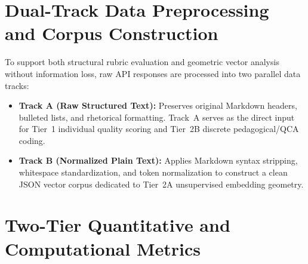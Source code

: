 \section{Dual-Track Data Preprocessing and Corpus Construction}
To support both structural rubric evaluation and geometric vector analysis without information loss, raw API responses are processed into two parallel data tracks:
\begin{itemize}
  \item \textbf{Track A (Raw Structured Text):} Preserves original Markdown headers, bulleted lists, and rhetorical formatting. Track~A serves as the direct input for Tier~1 individual quality scoring and Tier~2B discrete pedagogical/QCA coding.
  \item \textbf{Track B (Normalized Plain Text):} Applies Markdown syntax stripping, whitespace standardization, and token normalization to construct a clean JSON vector corpus dedicated to Tier~2A unsupervised embedding geometry.
\end{itemize}

\section{Two-Tier Quantitative and Computational Metrics}

